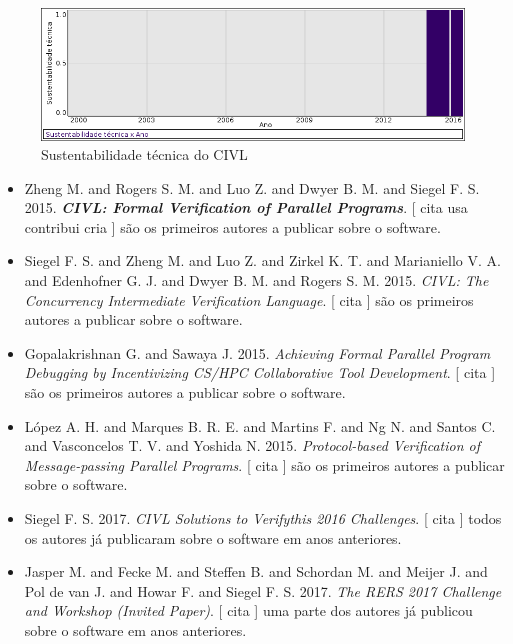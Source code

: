 \begin{figure}[h]
  \center
  \includegraphics[scale=0.50]{result-documents/charts/civl.png}
  \caption{Sustentabilidade técnica do CIVL}
\end{figure}


\begin{itemize}
\item Zheng M. and Rogers S. M. and Luo Z. and Dwyer B. M. and Siegel F. S.
      2015.
        \textbf{\textit{ CIVL: Formal Verification of Parallel Programs}}.
      [
          cita
          usa
          contribui
          cria
      ]
são os primeiros autores a publicar sobre o software.
\item Siegel F. S. and Zheng M. and Luo Z. and Zirkel K. T. and Marianiello V. A. and Edenhofner G. J. and Dwyer B. M. and Rogers S. M.
      2015.
        \textit{ CIVL: The Concurrency Intermediate Verification Language}.
      [
          cita
      ]
são os primeiros autores a publicar sobre o software.
\item Gopalakrishnan G. and Sawaya J.
      2015.
        \textit{ Achieving Formal Parallel Program Debugging by Incentivizing CS/HPC Collaborative Tool Development}.
      [
          cita
      ]
são os primeiros autores a publicar sobre o software.
\item L\'{o}pez A. H. and Marques B. R. E. and Martins F. and Ng N. and Santos C. and Vasconcelos T. V. and Yoshida N.
      2015.
        \textit{ Protocol-based Verification of Message-passing Parallel Programs}.
      [
          cita
      ]
são os primeiros autores a publicar sobre o software.
\item Siegel F. S.
      2017.
        \textit{ CIVL Solutions to Verifythis 2016 Challenges}.
      [
          cita
      ]
todos os autores já publicaram sobre o software em anos anteriores.
\item Jasper M. and Fecke M. and Steffen B. and Schordan M. and Meijer J. and Pol de van J. and Howar F. and Siegel F. S.
      2017.
        \textit{ The RERS 2017 Challenge and Workshop (Invited Paper)}.
      [
          cita
      ]
uma parte dos autores já publicou sobre o software em anos anteriores.
\end{itemize}
